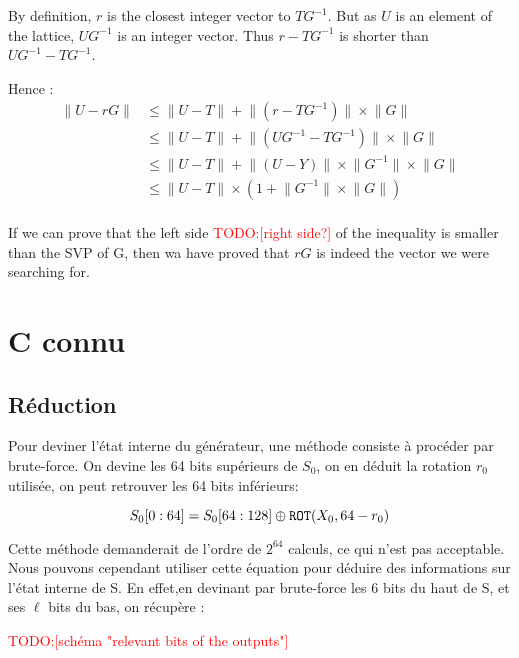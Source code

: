 \documentclass[preprint]{iacrtrans}
\newcommand{\todo}[1]{\textcolor{red}{TODO:[#1]}}
\begin{document}
By definition, \(r\) is the closest integer vector to \(TG^{-1}\). But as \(U\) is an element of the lattice, \(UG^{-1}\) is an integer vector. Thus \(r-TG^{-1}\) is shorter than \(UG^{-1}-TG^{-1}\).

Hence :
\begin{align*}
\lVert U - rG \rVert &\leqslant \lVert U - T \rVert + \lVert(r-TG^{-1})\rVert \times \lVert G\rVert\\	
&\leqslant \lVert U - T \rVert + \lVert(UG^{-1}-TG^{-1})\rVert \times \lVert G\rVert\\	
&\leqslant \lVert U - T \rVert + \lVert(U-Y)\rVert \times \lVert G^{-1} \rVert  \times \lVert G\rVert\\
& 	\leqslant \lVert U - T \rVert \times (1 +\lVert G^{-1} \rVert  \times \lVert G\rVert )\\
\end{align*}

If we can prove that the left side \todo{right side?} of the inequality is smaller than the SVP of G, then wa have proved that \(rG\) is indeed the vector we were searching for.


\section{C connu}

\subsection{Réduction}
Pour deviner l'état interne du générateur, une méthode consiste à procéder par brute-force. On devine les 64 bits supérieurs de $S_0$, on en déduit la rotation $r_0$ utilisée, on peut retrouver  les 64 bits inférieurs:

\begin{equation}
   S_0[0:64] = S_0[64:128] \oplus \texttt{ROT}(X_0 , 64 - r_0) \\
\end{equation}

Cette méthode demanderait de l'ordre de $2^{64}$ calculs, ce qui n'est pas acceptable. Nous pouvons cependant utiliser cette équation pour déduire des informations sur l'état interne de S. En effet,en devinant par brute-force les 6 bits du haut de S, et ses $\ell$ bits du bas, on récupère :

\todo{schéma "relevant bits of the outputs"}
\end{document}
